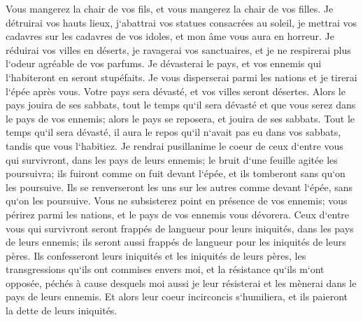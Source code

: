 \verse Vous mangerez la chair de vos fils, et vous mangerez la chair de vos filles. 
\verse Je détruirai vos hauts lieux, j`abattrai vos statues consacrées au soleil, je mettrai vos cadavres sur les cadavres de vos idoles, et mon âme vous aura en horreur. 
\verse Je réduirai vos villes en déserts, je ravagerai vos sanctuaires, et je ne respirerai plus l`odeur agréable de vos parfums. 
\verse Je dévasterai le pays, et vos ennemis qui l`habiteront en seront stupéfaits. 
\verse Je vous disperserai parmi les nations et je tirerai l`épée après vous. Votre pays sera dévasté, et vos villes seront désertes. 
\verse Alors le pays jouira de ses sabbats, tout le temps qu`il sera dévasté et que vous serez dans le pays de vos ennemis; alors le pays se reposera, et jouira de ses sabbats. 
\verse Tout le temps qu`il sera dévasté, il aura le repos qu`il n`avait pas eu dans vos sabbats, tandis que vous l`habitiez. 
\verse Je rendrai pusillanime le coeur de ceux d`entre vous qui survivront, dans les pays de leurs ennemis; le bruit d`une feuille agitée les poursuivra; ils fuiront comme on fuit devant l`épée, et ils tomberont sans qu`on les poursuive. 
\verse Ils se renverseront les uns sur les autres comme devant l`épée, sans qu`on les poursuive. Vous ne subsisterez point en présence de vos ennemis; 
\verse vous périrez parmi les nations, et le pays de vos ennemis vous dévorera. 
\verse Ceux d`entre vous qui survivront seront frappés de langueur pour leurs iniquités, dans les pays de leurs ennemis; ils seront aussi frappés de langueur pour les iniquités de leurs pères. 
\verse Ils confesseront leurs iniquités et les iniquités de leurs pères, les transgressions qu`ils ont commises envers moi, et la résistance qu`ils m`ont opposée, 
\verse péchés à cause desquels moi aussi je leur résisterai et les mènerai dans le pays de leurs ennemis. Et alors leur coeur incirconcis s`humiliera, et ils paieront la dette de leurs iniquités. 
